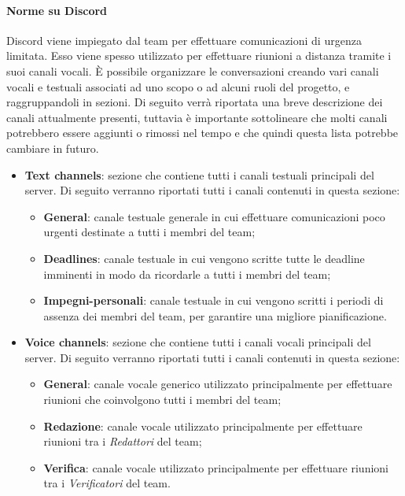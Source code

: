 \paragraph{Norme su Discord}\Spazio
 Discord viene impiegato dal team per effettuare comunicazioni di urgenza limitata. Esso viene spesso utilizzato per effettuare riunioni a distanza tramite i suoi canali vocali. 
 È possibile organizzare le conversazioni creando vari canali vocali e testuali associati ad uno scopo o ad alcuni ruoli del progetto, e raggruppandoli in sezioni. Di seguito verrà riportata una breve descrizione dei canali attualmente presenti, tuttavia è importante sottolineare che molti canali potrebbero essere aggiunti o rimossi nel tempo e che quindi questa lista potrebbe cambiare in futuro.\newline
 \begin{itemize}
	\item{\textbf{Text channels}: sezione che contiene tutti i canali testuali principali del server. Di seguito verranno riportati tutti i canali contenuti in questa sezione:
		\begin{itemize}
			\item{\textbf{General}: canale testuale generale in cui effettuare comunicazioni poco urgenti destinate a tutti i membri del team;}
			\item{\textbf{Deadlines}: canale testuale in cui vengono scritte tutte le deadline imminenti in modo da ricordarle a tutti i membri del team;}
			\item{\textbf{Impegni-personali}: canale testuale in cui vengono scritti i periodi di assenza dei membri del team, per garantire una migliore pianificazione.}
		\end{itemize}
	}
	\item{\textbf{Voice channels}: sezione che contiene tutti i canali vocali principali del server. Di seguito verranno riportati tutti i canali contenuti in questa sezione:
		\begin{itemize}
			\item{\textbf{General}: canale vocale generico utilizzato principalmente per effettuare riunioni che coinvolgono tutti i membri del team;}
			\item{\textbf{Redazione}: canale vocale utilizzato principalmente per effettuare riunioni tra i \emph{Redattori} del team;}
			\item{\textbf{Verifica}: canale vocale utilizzato principalmente per effettuare riunioni tra i \emph{Verificatori} del team.}
		\end{itemize}
}
\end{itemize}
